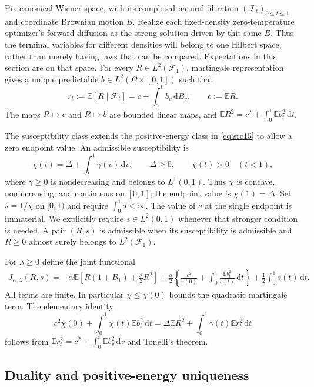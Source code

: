 \documentclass[11pt,a4paper]{article}
\numberwithin{equation}{section}
\theoremstyle{definition}
\theoremstyle{remark}
\newcommand{\E}{\mathbb E}
\newcommand{\dd}{\mathrm d}
\begin{document}
Fix canonical Wiener space, with its completed natural filtration
$(\mathcal F_t)_{0\le t\le1}$ and coordinate Brownian motion $B$.
Realize each fixed-density zero-temperature optimizer's forward diffusion
as the strong solution driven by this same $B$. Thus the terminal variables
for different densities will belong to one Hilbert space, rather than
merely having laws that can be compared. Expectations in this section
are on that space. For every
$R\in L^2(\mathcal F_1)$, martingale representation gives a unique predictable
$b\in L^2(\Omega\times[0,1])$ such that
\[
 r_t:=\E[R\mid\mathcal F_t]
      =c+\int_0^t b_v\,\dd B_v,\qquad c:=\E R.
\]
The maps $R\mapsto c$ and $R\mapsto b$ are bounded linear maps, and
$\E R^2=c^2+\int_0^1\E b_t^2\,\dd t$.

The susceptibility class extends the positive-energy class in
\eqref{eq:src15} to allow a zero endpoint value. An admissible
susceptibility is
\[
 \chi(t)=\Delta+\int_t^1\gamma(v)\,\dd v,
 \qquad \Delta\ge0,\qquad \chi(t)>0\quad(t<1),
\]
where $\gamma\ge0$ is nondecreasing and belongs to $L^1(0,1)$.
Thus $\chi$ is concave, nonincreasing, and continuous on $[0,1]$; the endpoint
value is $\chi(1)=\Delta$.  Set $s=1/\chi$ on $[0,1)$ and require
$\int_0^1s<\infty$.  The value of $s$ at the single endpoint is immaterial.
We explicitly require $s\in L^2(0,1)$ whenever that stronger condition
is needed.  A pair $(R,s)$ is admissible when its susceptibility is
admissible and $R\ge0$ almost surely belongs to $L^2(\mathcal F_1)$.

For $\lambda\ge0$ define the joint functional
\begin{equation}\label{crit:def-functional}
 \begin{split}
 J_{\alpha,\lambda}(R,s)
  ={}&\alpha\E\left[R(1+B_1)+\frac\lambda2R^2\right]
   +\frac\alpha2\left\{\frac{c^2}{s(0)}
         +\int_0^1\frac{\E b_t^2}{s(t)}\,\dd t\right\}
   +\frac12\int_0^1s(t)\,\dd t .
 \end{split}
\end{equation}
All terms are finite.  In particular $\chi\le\chi(0)$ bounds the quadratic
martingale term.  The elementary identity
\begin{equation}\label{crit:quadratic-identity}
 c^2\chi(0)+\int_0^1\chi(t)\E b_t^2\,\dd t
   =\Delta\E R^2+\int_0^1\gamma(t)\E r_t^2\,\dd t
\end{equation}
follows from $\E r_t^2=c^2+\int_0^t\E b_v^2\,\dd v$ and Tonelli's theorem.

\subsection{Duality and positive-energy uniqueness}
\end{document}
